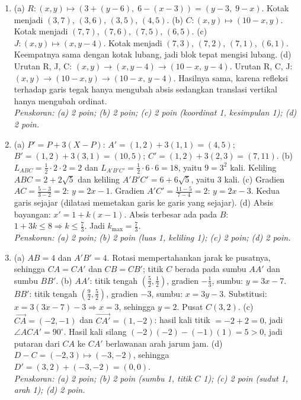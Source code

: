 \documentclass[a4paper,11pt]{article}
\newcounter{no}
\begin{document}
\par{}\par\vspace{0.2em}
\small\begin{enumerate}[leftmargin=2em,itemsep=3pt,topsep=2pt]
\item[\textbf{1.}] (a) $R:(x,y)\mapsto(3+(y-6),\;6-(x-3))=(y-3,\;9-x)$. Kotak menjadi $(3,7)$, $(3,6)$, $(3,5)$, $(4,5)$. (b) $C:(x,y)\mapsto(10-x,y)$. Kotak menjadi $(7,7)$, $(7,6)$, $(7,5)$, $(6,5)$. (c) $J:(x,y)\mapsto(x,y-4)$. Kotak menjadi $(7,3)$, $(7,2)$, $(7,1)$, $(6,1)$. Keempatnya sama dengan kotak lubang, jadi blok tepat mengisi lubang. (d) Urutan R, J, C: $(x,y)\to(x,y-4)\to(10-x,\,y-4)$. Urutan R, C, J: $(x,y)\to(10-x,y)\to(10-x,\,y-4)$. Hasilnya sama, karena refleksi terhadap garis tegak hanya mengubah absis sedangkan translasi vertikal hanya mengubah ordinat. \\ \textit{Penskoran: (a) 2 poin; (b) 2 poin; (c) 2 poin (koordinat 1, kesimpulan 1); (d) 2 poin.}
\item[\textbf{2.}] (a) $P'=P+3(X-P)$: $A'=(1,2)+3(1,1)=(4,5)$; $B'=(1,2)+3(3,1)=(10,5)$; $C'=(1,2)+3(2,3)=(7,11)$. (b) $L_{ABC}=\frac12\cdot2\cdot2=2$ dan $L_{A'B'C'}=\frac12\cdot6\cdot6=18$, yaitu $9=3^2$ kali. Keliling $ABC=2+2\sqrt5$ dan keliling $A'B'C'=6+6\sqrt5$, yaitu $3$ kali. (c) Gradien $AC=\frac{5-3}{3-2}=2$: $y=2x-1$. Gradien $A'C'=\frac{11-5}{7-4}=2$: $y=2x-3$. Kedua garis sejajar (dilatasi memetakan garis ke garis yang sejajar). (d) Absis bayangan: $x'=1+k(x-1)$. Absis terbesar ada pada $B$: $1+3k\le8\Rightarrow k\le\frac73$. Jadi $k_{\max}=\frac73$. \\ \textit{Penskoran: (a) 2 poin; (b) 2 poin (luas 1, keliling 1); (c) 2 poin; (d) 2 poin.}
\item[\textbf{3.}] (a) $AB=4$ dan $A'B'=4$. Rotasi mempertahankan jarak ke pusatnya, sehingga $CA=CA'$ dan $CB=CB'$; titik $C$ berada pada sumbu $AA'$ dan sumbu $BB'$. (b) $AA'$: titik tengah $\left(\frac52,\frac12\right)$, gradien $-\frac13$, sumbu: $y=3x-7$. $BB'$: titik tengah $\left(\frac92,\frac52\right)$, gradien $-3$, sumbu: $x=3y-3$. Substitusi: $x=3(3x-7)-3\Rightarrow x=3$, sehingga $y=2$. Pusat $C(3,2)$. (c) $\overrightarrow{CA}=(-2,-1)$ dan $\overrightarrow{CA'}=(1,-2)$: hasil kali titik $=-2+2=0$, jadi $\angle ACA'=90^\circ$. Hasil kali silang $(-2)(-2)-(-1)(1)=5>0$, jadi putaran dari $CA$ ke $CA'$ berlawanan arah jarum jam. (d) $D-C=(-2,3)\mapsto(-3,-2)$, sehingga $D'=(3,2)+(-3,-2)=(0,0)$. \\ \textit{Penskoran: (a) 2 poin; (b) 2 poin (sumbu 1, titik $C$ 1); (c) 2 poin (sudut 1, arah 1); (d) 2 poin.}

\end{enumerate}
\end{document}
